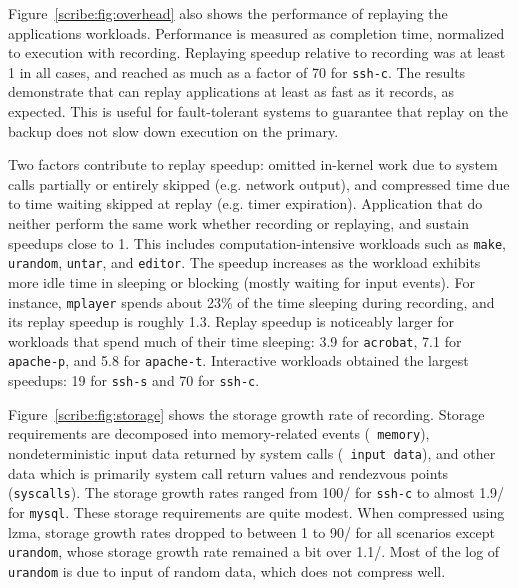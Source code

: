 \begin{table}[]
Figure~\ref{scribe:fig:overhead} also shows the performance of replaying the
applications workloads. Performance is measured as completion time,
normalized to execution with recording. Replaying speedup relative to
recording was at least 1 in all cases, and reached as much as a factor
of 70 for {\tt ssh-c}. The results demonstrate that \scribe{} can
replay applications at least as fast as it records, as expected. This
is useful for fault-tolerant systems to guarantee that replay on the
backup does not slow down execution on the primary.

Two factors contribute to replay speedup: omitted in-kernel work due
to system calls partially or entirely skipped (e.g. network output),
and compressed time due to time waiting skipped at replay (e.g. timer
expiration). Application that do neither perform the same work whether
recording or replaying, and sustain speedups close to 1. This includes
computation-intensive workloads such as {\tt make}, {\tt urandom},
{\tt untar}, and {\tt editor}. The speedup increases as the workload
exhibits more idle time in sleeping or blocking (mostly waiting for
input events). For instance, {\tt mplayer} spends about 23\% of the
time sleeping during recording, and its replay speedup is roughly
1.3. Replay speedup is noticeably larger for workloads
that spend much of their time sleeping: 3.9 for {\tt acrobat},
7.1 for {\tt apache-p}, and 5.8 for {\tt apache-t}.
Interactive workloads obtained
the largest speedups: 19 for {\tt ssh-s} and 70 for {\tt ssh-c}.

Figure~\ref{scribe:fig:storage} shows the storage growth rate of recording.
Storage requirements are decomposed into memory-related events ({\tt
  memory}), nondeterministic input data returned by system calls ({\tt
  input data}), and other data which is primarily system call return
values and rendezvous points ({\tt syscalls}).  The storage growth
rates ranged from 100\KB{}/\secs{} for {\tt ssh-c} to almost
1.9\MB{}/\secs{} for {\tt mysql}.  These storage requirements are
quite modest.  When compressed using lzma, storage growth rates
dropped to between 1 to 90\KB{}/\secs{} for all scenarios except {\tt
  urandom}, whose storage growth rate 
remained a bit over 1.1\MB{}/\secs{}.  Most of the log of
{\tt urandom} is due to input of random data, which does not compress
well.  


\end{table}
